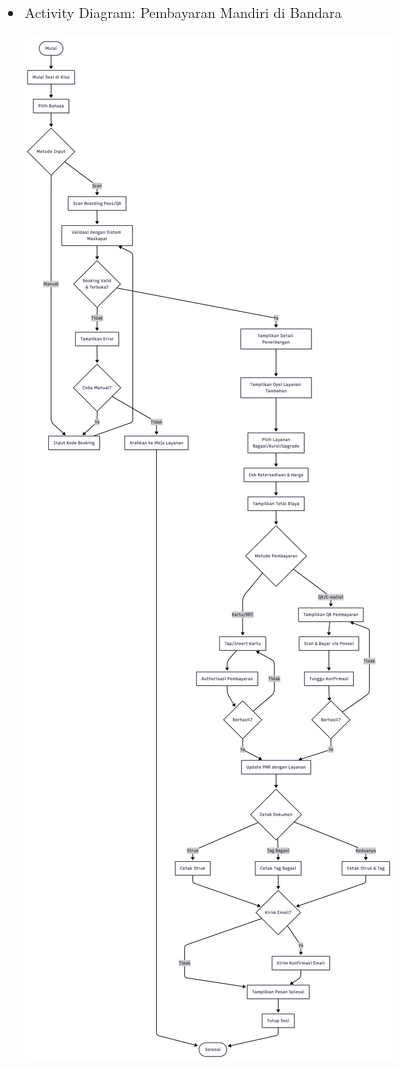 \documentclass[a4paper]{article}
\begin{document}
\begin{enumerate}[itemsep=1em]
  \begin{itemize}[itemsep=1em]
    \item Activity Diagram: Pembayaran Mandiri di Bandara
    \begin{center}
      \includegraphics[height=0.9\textheight,keepaspectratio]{airport-payment-activity-diagram.png}
    \end{center}
  \end{itemize}
  

\end{enumerate}
\end{document}
